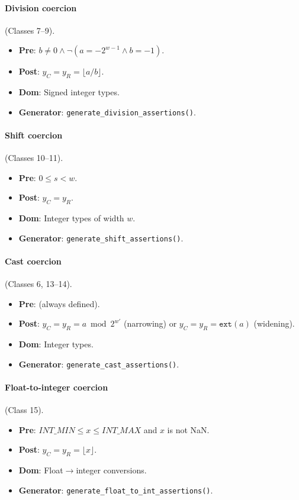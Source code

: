 \documentclass[10pt,a4paper]{article}
\begin{document}
\begin{appendices}
\paragraph{Division coercion} (Classes 7--9).
\begin{itemize}[nosep]
  \item \textbf{Pre}: $b \neq 0 \wedge \neg(a = -2^{w-1} \wedge b = -1)$.
  \item \textbf{Post}: $y_C = y_R = \lfloor a / b \rfloor$.
  \item \textbf{Dom}: Signed integer types.
  \item \textbf{Generator}: \texttt{generate\_division\_assertions()}.
\end{itemize}

\paragraph{Shift coercion} (Classes 10--11).
\begin{itemize}[nosep]
  \item \textbf{Pre}: $0 \leq s < w$.
  \item \textbf{Post}: $y_C = y_R$.
  \item \textbf{Dom}: Integer types of width $w$.
  \item \textbf{Generator}: \texttt{generate\_shift\_assertions()}.
\end{itemize}

\paragraph{Cast coercion} (Classes 6, 13--14).
\begin{itemize}[nosep]
  \item \textbf{Pre}: (always defined).
  \item \textbf{Post}: $y_C = y_R = a \bmod 2^{w'}$ (narrowing) or
    $y_C = y_R = \texttt{ext}(a)$ (widening).
  \item \textbf{Dom}: Integer types.
  \item \textbf{Generator}: \texttt{generate\_cast\_assertions()}.
\end{itemize}

\paragraph{Float-to-integer coercion} (Class 15).
\begin{itemize}[nosep]
  \item \textbf{Pre}: $\mathit{INT\_MIN} \leq x \leq \mathit{INT\_MAX}$
    and $x$ is not NaN.
  \item \textbf{Post}: $y_C = y_R = \lfloor x \rfloor$.
  \item \textbf{Dom}: Float$\to$integer conversions.
  \item \textbf{Generator}: \texttt{generate\_float\_to\_int\_assertions()}.
\end{itemize}


\end{appendices}
\end{document}
